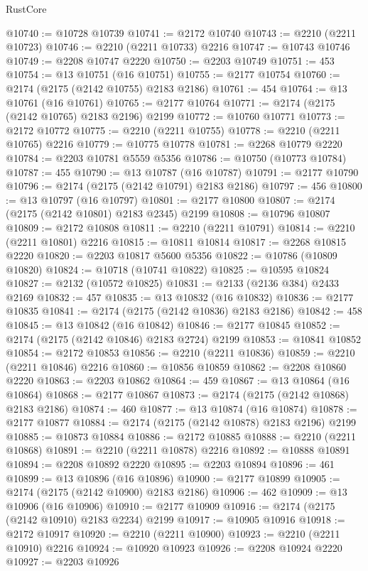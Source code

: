 \begin{lexlean}{RustCore}
\begin{coremodule}
@10740 := @10728 @10739
@10741 := @2172 @10740
@10743 := @2210 (@2211 @10723)
@10746 := @2210 (@2211 @10733) @2216
@10747 := @10743 @10746
@10749 := @2208 @10747 @2220
@10750 := @2203 @10749
@10751 := 453
@10754 := @13 @10751 (@16 @10751)
@10755 := @2177 @10754
@10760 := @2174 (@2175 (@2142 @10755) @2183 @2186)
@10761 := 454
@10764 := @13 @10761 (@16 @10761)
@10765 := @2177 @10764
@10771 := @2174 (@2175 (@2142 @10765) @2183 @2196) @2199
@10772 := @10760 @10771
@10773 := @2172 @10772
@10775 := @2210 (@2211 @10755)
@10778 := @2210 (@2211 @10765) @2216
@10779 := @10775 @10778
@10781 := @2268 @10779 @2220
@10784 := @2203 @10781 @5559 @5356
@10786 := @10750 (@10773 @10784)
@10787 := 455
@10790 := @13 @10787 (@16 @10787)
@10791 := @2177 @10790
@10796 := @2174 (@2175 (@2142 @10791) @2183 @2186)
@10797 := 456
@10800 := @13 @10797 (@16 @10797)
@10801 := @2177 @10800
@10807 := @2174 (@2175 (@2142 @10801) @2183 @2345) @2199
@10808 := @10796 @10807
@10809 := @2172 @10808
@10811 := @2210 (@2211 @10791)
@10814 := @2210 (@2211 @10801) @2216
@10815 := @10811 @10814
@10817 := @2268 @10815 @2220
@10820 := @2203 @10817 @5600 @5356
@10822 := @10786 (@10809 @10820)
@10824 := @10718 (@10741 @10822)
@10825 := @10595 @10824
@10827 := @2132 (@10572 @10825)
@10831 := @2133 (@2136 @384) @2433 @2169
@10832 := 457
@10835 := @13 @10832 (@16 @10832)
@10836 := @2177 @10835
@10841 := @2174 (@2175 (@2142 @10836) @2183 @2186)
@10842 := 458
@10845 := @13 @10842 (@16 @10842)
@10846 := @2177 @10845
@10852 := @2174 (@2175 (@2142 @10846) @2183 @2724) @2199
@10853 := @10841 @10852
@10854 := @2172 @10853
@10856 := @2210 (@2211 @10836)
@10859 := @2210 (@2211 @10846) @2216
@10860 := @10856 @10859
@10862 := @2208 @10860 @2220
@10863 := @2203 @10862
@10864 := 459
@10867 := @13 @10864 (@16 @10864)
@10868 := @2177 @10867
@10873 := @2174 (@2175 (@2142 @10868) @2183 @2186)
@10874 := 460
@10877 := @13 @10874 (@16 @10874)
@10878 := @2177 @10877
@10884 := @2174 (@2175 (@2142 @10878) @2183 @2196) @2199
@10885 := @10873 @10884
@10886 := @2172 @10885
@10888 := @2210 (@2211 @10868)
@10891 := @2210 (@2211 @10878) @2216
@10892 := @10888 @10891
@10894 := @2208 @10892 @2220
@10895 := @2203 @10894
@10896 := 461
@10899 := @13 @10896 (@16 @10896)
@10900 := @2177 @10899
@10905 := @2174 (@2175 (@2142 @10900) @2183 @2186)
@10906 := 462
@10909 := @13 @10906 (@16 @10906)
@10910 := @2177 @10909
@10916 := @2174 (@2175 (@2142 @10910) @2183 @2234) @2199
@10917 := @10905 @10916
@10918 := @2172 @10917
@10920 := @2210 (@2211 @10900)
@10923 := @2210 (@2211 @10910) @2216
@10924 := @10920 @10923
@10926 := @2208 @10924 @2220
@10927 := @2203 @10926

\end{coremodule}
\end{lexlean}
